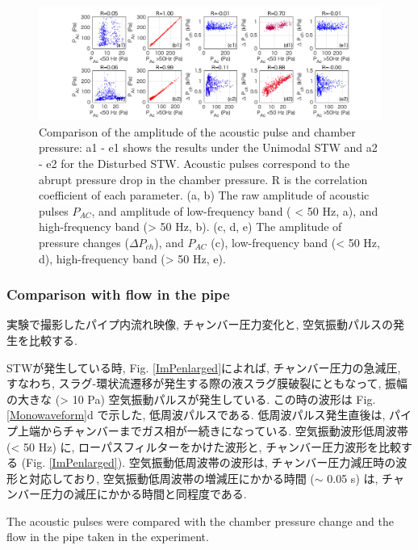 \documentclass[12pt]{article}
\begin{document}
\begin{landscape}
\begin{figure}[H]
\begin{center}
\includegraphics[scale=1] {PAPCall.png} 
\caption{Comparison of the amplitude of the acoustic pulse and chamber pressure: a1 - e1 shows the results under the Unimodal STW and a2 - e2 for the Disturbed STW.
Acoustic pulses correspond to the abrupt pressure drop in the chamber pressure.
R is the correlation coefficient of each parameter. 
(a, b) The raw amplitude of acoustic pulses $P_{AC}$, and amplitude of low-frequency band ( < 50 Hz, a), and high-frequency band (> 50 Hz, b).
(c, d, e) The amplitude of pressure changes ($\Delta P_{ch}$), and $P_{AC}$ (c), low-frequency band (< 50 Hz, d), high-frequency band (> 50 Hz, e).}
\label{PAPCall}
\end{center}
\end{figure} 
\end{landscape}



\clearpage
\subsubsection{Comparison with flow in the pipe}
実験で撮影したパイプ内流れ映像, チャンバー圧力変化と, 空気振動パルスの発生を比較する.

STWが発生している時, Fig. \ref{ImPenlarged}によれば, チャンバー圧力の急減圧, すなわち, スラグ-環状流遷移が発生する際の液スラグ膜破裂にともなって, 振幅の大きな (> 10 Pa) 空気振動パルスが発生している. 
この時の波形は Fig. \ref{Monowaveform}d で示した, 低周波パルスである. 
低周波パルス発生直後は, パイプ上端からチャンバーまでガス相が一続きになっている.
空気振動波形低周波帯 (< 50 Hz) に, ローパスフィルターをかけた波形と, チャンバー圧力波形を比較する (Fig. \ref{ImPenlarged}). 
空気振動低周波帯の波形は, チャンバー圧力減圧時の波形と対応しており, 空気振動低周波帯の増減圧にかかる時間 ($\sim$ 0.05 s) は, チャンバー圧力の減圧にかかる時間と同程度である.

The acoustic pulses were compared with the chamber pressure change and the flow in the pipe taken in the experiment.
\end{document}
